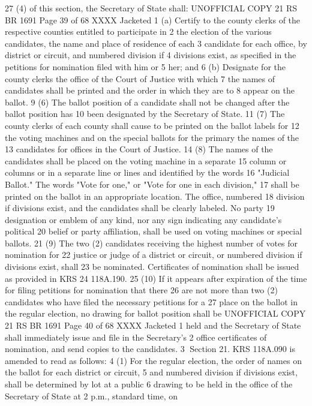 27 (4) of this section, the Secretary of State shall:
UNOFFICIAL COPY 21 RS BR 1691
Page 39 of 68
XXXX Jacketed
1 (a) Certify to the county clerks of the respective counties entitled to participate in
2 the election of the various candidates, the name and place of residence of each
3 candidate for each office, by district or circuit, and numbered division if
4 divisions exist, as specified in the petitions for nomination filed with him or
5 her; and
6 (b) Designate for the county clerks the office of the Court of Justice with which
7 the names of candidates shall be printed and the order in which they are to
8 appear on the ballot.
9 (6) The ballot position of a candidate shall not be changed after the ballot position has
10 been designated by the Secretary of State.
11 (7) The county clerks of each county shall cause to be printed on the ballot labels for
12 the voting machines and on the special ballots for the primary the names of the
13 candidates for offices in the Court of Justice.
14 (8) The names of the candidates shall be placed on the voting machine in a separate
15 column or columns or in a separate line or lines and identified by the words
16 "Judicial Ballot." The words "Vote for one," or "Vote for one in each division,"
17 shall be printed on the ballot in an appropriate location. The office, numbered
18 division if divisions exist, and the candidates shall be clearly labeled. No party
19 designation or emblem of any kind, nor any sign indicating any candidate's political
20 belief or party affiliation, shall be used on voting machines or special ballots.
21 (9) The two (2) candidates receiving the highest number of votes for nomination for
22 justice or judge of a district or circuit, or numbered division if divisions exist, shall
23 be nominated. Certificates of nomination shall be issued as provided in KRS
24 118A.190.
25 (10) If it appears after expiration of the time for filing petitions for nomination that there
26 are not more than two (2) candidates who have filed the necessary petitions for a
27 place on the ballot in the regular election, no drawing for ballot position shall be 
UNOFFICIAL COPY 21 RS BR 1691
Page 40 of 68
XXXX Jacketed
1 held and the Secretary of State shall immediately issue and file in the Secretary's
2 office certificates of nomination, and send copies to the candidates.
3 Section 21. KRS 118A.090 is amended to read as follows:
4 (1) For the regular election, the order of names on the ballot for each district or circuit,
5 and numbered division if divisions exist, shall be determined by lot at a public
6 drawing to be held in the office of the Secretary of State at 2 p.m., standard time, on
